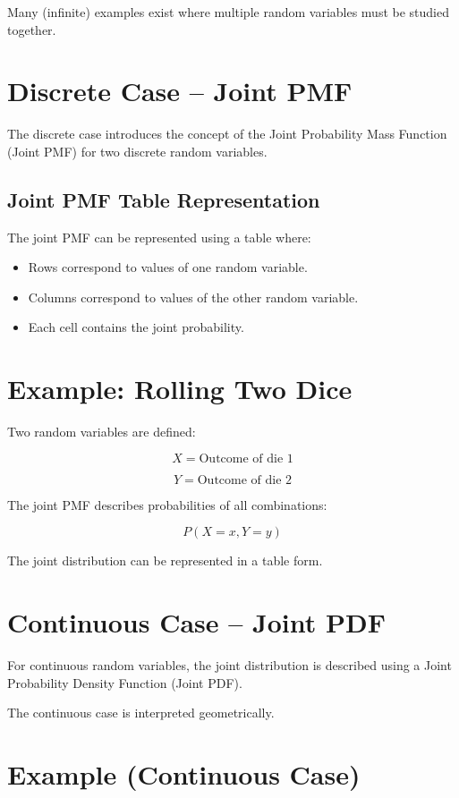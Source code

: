 \documentclass[11pt]{article}
\begin{document}
Many (infinite) examples exist where multiple random variables must be studied together.

\section{Discrete Case – Joint PMF}

The discrete case introduces the concept of the Joint Probability Mass Function (Joint PMF) for two discrete random variables.

\subsection{Joint PMF Table Representation}

The joint PMF can be represented using a table where:

\begin{itemize}
\item Rows correspond to values of one random variable.
\item Columns correspond to values of the other random variable.
\item Each cell contains the joint probability.
\end{itemize}

\section{Example: Rolling Two Dice}

Two random variables are defined:

\[
X = \text{Outcome of die 1}
\]

\[
Y = \text{Outcome of die 2}
\]

The joint PMF describes probabilities of all combinations:

\[
P(X=x,Y=y)
\]

The joint distribution can be represented in a table form.

\section{Continuous Case – Joint PDF}

For continuous random variables, the joint distribution is described using a Joint Probability Density Function (Joint PDF).

The continuous case is interpreted geometrically.

\section{Example (Continuous Case)}
\end{document}
